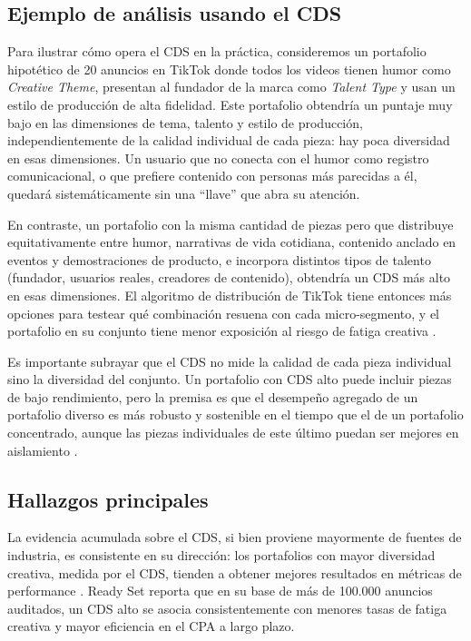\documentclass[12pt, a4paper]{report}
\begin{document}
\subsection{Ejemplo de análisis usando el CDS}

Para ilustrar cómo opera el CDS en la práctica, consideremos un portafolio hipotético de 20 anuncios
en TikTok donde todos los videos tienen humor como \textit{Creative Theme}, presentan al fundador de
la marca como \textit{Talent Type} y usan un estilo de producción de alta fidelidad. Este portafolio
obtendría un puntaje muy bajo en las dimensiones de tema, talento y estilo de producción,
independientemente de la calidad individual de cada pieza: hay poca diversidad en esas dimensiones.
Un usuario que no conecta con el humor como registro comunicacional, o que prefiere contenido con
personas más parecidas a él, quedará sistemáticamente sin una ``llave'' que abra su atención.

En contraste, un portafolio con la misma cantidad de piezas pero que distribuye equitativamente entre
humor, narrativas de vida cotidiana, contenido anclado en eventos y demostraciones de producto, e
incorpora distintos tipos de talento (fundador, usuarios reales, creadores de contenido), obtendría
un CDS más alto en esas dimensiones. El algoritmo de distribución de TikTok tiene entonces más
opciones para testear qué combinación resuena con cada micro-segmento, y el portafolio en su conjunto
tiene menor exposición al riesgo de fatiga creativa \citep{readyset2025}.

Es importante subrayar que el CDS no mide la calidad de cada pieza individual sino la diversidad del
conjunto. Un portafolio con CDS alto puede incluir piezas de bajo rendimiento, pero la premisa es que el
desempeño agregado de un portafolio diverso es más robusto y sostenible en el tiempo que el de un
portafolio concentrado, aunque las piezas individuales de este último puedan ser mejores en aislamiento
\citep{meta2024a}.

\subsection{Hallazgos principales}

La evidencia acumulada sobre el CDS, si bien proviene mayormente de fuentes de industria, es consistente en su dirección: 
los portafolios con mayor
diversidad creativa, medida por el CDS, tienden a obtener mejores resultados en métricas de performance
\citep{readyset2025}. Ready Set reporta que en su base de más de 100.000 anuncios auditados, un CDS
alto se asocia consistentemente con menores tasas de fatiga creativa y mayor eficiencia en el CPA
a largo plazo.
\end{document}
